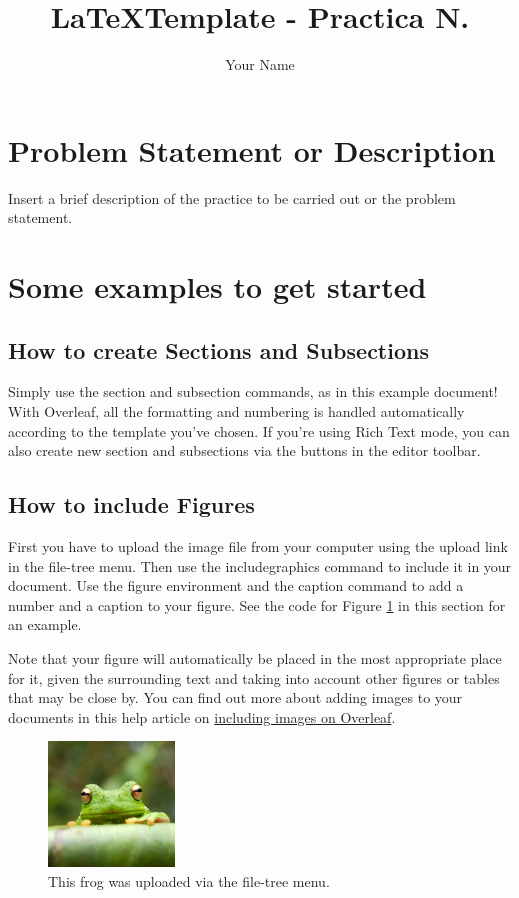 \documentclass{article}
\title{\LaTeX Template - Practica N.}
\author{Your Name}
\begin{document}
\maketitle

\section{Problem Statement or Description}

Insert a brief description of the practice to be carried out or the problem statement.

\section{Some examples to get started}

\subsection{How to create Sections and Subsections}

Simply use the section and subsection commands, as in this example document! With Overleaf, all the formatting and numbering is handled automatically according to the template you've chosen. If you're using Rich Text mode, you can also create new section and subsections via the buttons in the editor toolbar.

\subsection{How to include Figures}

First you have to upload the image file from your computer using the upload link in the file-tree menu. Then use the includegraphics command to include it in your document. Use the figure environment and the caption command to add a number and a caption to your figure. See the code for Figure \ref{fig:frog} in this section for an example.

Note that your figure will automatically be placed in the most appropriate place for it, given the surrounding text and taking into account other figures or tables that may be close by. You can find out more about adding images to your documents in this help article on \href{https://www.overleaf.com/learn/how-to/Including_images_on_Overleaf}{including images on Overleaf}.

\begin{figure}
\centering
\includegraphics[width=0.3\textwidth]{frog.jpg}
\caption{\label{fig:frog}This frog was uploaded via the file-tree menu.}
\end{figure}
\end{document}

